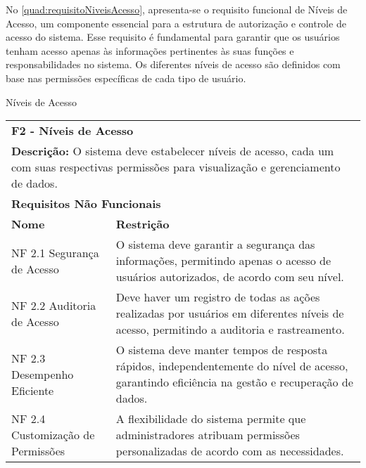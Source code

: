 No \autoref{quad:requisitoNiveisAcesso}, apresenta-se o requisito funcional de Níveis de Acesso, um componente essencial para a estrutura de autorização e controle de acesso do sistema. Esse requisito é fundamental para garantir que os usuários tenham acesso apenas às informações pertinentes às suas funções e responsabilidades no sistema. Os diferentes níveis de acesso são definidos com base nas permissões específicas de cada tipo de usuário.

\begin{tabframed}[htb]
  \caption{Níveis de Acesso}
  \label{quad:requisitoNiveisAcesso}
  \renewcommand{\arraystretch}{1.5}
  \begin{tabular}{|l|l|}
    \cline{1-2}
    \multicolumn{2}{|l|}{\textbf{F2 - Níveis de Acesso}}
    \\ \cline{1-2}

    \multicolumn{2}{|p{15cm}|}{
    \raggedright \textbf{Descrição:} O sistema deve estabelecer níveis de acesso, cada um com suas respectivas permissões para visualização e gerenciamento de dados.
    }
    \\ \cline{1-2}

    \multicolumn{2}{|l|}{\textbf{Requisitos Não Funcionais}}
    \\ \cline{1-2}

    \textbf{Nome}                     &
    \textbf{Restrição}
    \\ \cline{1-2}

    NF 2.1 Segurança de Acesso        &
    \multicolumn{1}{|p{8cm}|}{\raggedright O sistema deve garantir a segurança das informações, permitindo apenas o acesso de usuários autorizados, de acordo com seu nível.}
    \\ \cline{1-2}

    NF 2.2 Auditoria de Acesso        &
    \multicolumn{1}{|p{8cm}|}{\raggedright Deve haver um registro de todas as ações realizadas por usuários em diferentes níveis de acesso, permitindo a auditoria e rastreamento.}
    \\ \cline{1-2}

    NF 2.3 Desempenho Eficiente       &
    \multicolumn{1}{|p{8cm}|}{\raggedright O sistema deve manter tempos de resposta rápidos, independentemente do nível de acesso, garantindo eficiência na gestão e recuperação de dados.}
    \\ \cline{1-2}

    NF 2.4 Customização de Permissões &
    \multicolumn{1}{|p{8cm}|}{\raggedright A flexibilidade do sistema permite que administradores atribuam permissões personalizadas de acordo com as necessidades.}
    \\ \cline{1-2}
  \end{tabular}
  \fonte{} %
\end{tabframed}

